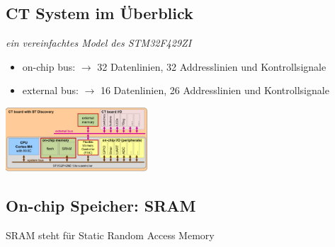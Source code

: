 \documentclass{article}
\newenvironment{Figure}
	{\par\medskip\noindent\minipage{\linewidth}}
	{\endminipage\par\medskip}
\begin{document}
\subsection{CT System im Überblick}
\textit{ein vereinfachtes Model des STM32F429ZI}
\begin{itemize}
\item on-chip bus: $\rightarrow$ 32 Datenlinien, 32 Addresslinien und Kontrollsignale
\item external bus: $\rightarrow$ 16 Datenlinien, 26 Addresslinien und Kontrollsignale
\end{itemize}
\begin{Figure}
\centering
\includegraphics[width=200px]{img/vereinfachtesModellCTBoard.png}
	\label{fig:CT board mit ST Discovery}
\end{Figure}

\subsection{On-chip Speicher: SRAM}
SRAM steht für Static Random Access Memory
\end{document}
